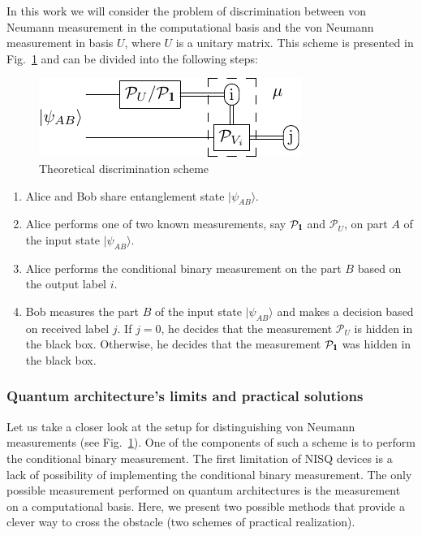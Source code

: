 \documentclass[preprint,12pt, a4paper]{elsarticle}
\newcommand{\ket}[1]{\ensuremath{|#1\rangle}}
\newcommand{\1}{{\rm 1\hspace{-0.9mm}l}}
\newcommand{\Id}{{\rm 1\hspace{-0.9mm}l}}
\newcommand{\PP}{\mathcal{P}}
\begin{document}
In this work we will consider the problem of discrimination between von Neumann measurement in the computational basis  and  the von Neumann measurement in basis $U$, where $U$ is a unitary matrix. 
This scheme is 
presented in Fig.~\ref{fig:theoretical_scheme} and 
can be divided into the following steps:





\begin{figure}[h!]
	\centering
	\includegraphics[scale=1.7]{pics/theoretical_scheme}
	\caption{Theoretical discrimination scheme}
	\label{fig:theoretical_scheme}
\end{figure}


\begin{enumerate}\item Alice and Bob share entanglement state $\ket{\psi_{AB}}$.
	\item Alice performs one of two known measurements,  say $\PP_{\Id}$ and $\PP_{U}$,  on part $A$ of the input 
	state  $\ket{\psi_{AB}}$.
	\item Alice   performs the conditional binary measurement on the part 
	$B$ based on
	the output label $i$. 
	\item  Bob measures the part $B$ of the input state  $\ket{\psi_{AB}}$ and 
	makes a decision based on received label $j$. If $j=0$, he decides that the measurement $\PP_U$ is hidden in the black box. Otherwise, he decides that the measurement $\PP_{\Id}$ was hidden in the black box. 
\end{enumerate}  


\subsubsection{Quantum architecture's limits and practical solutions}



Let us take a closer look at the setup for distinguishing von Neumann 
measurements (see Fig.~\ref{fig:theoretical_scheme}). One of the components of such a 
scheme is to perform the conditional binary measurement. The first limitation of NISQ devices 
is a lack of possibility of implementing the conditional binary measurement. 
The only possible measurement performed on quantum architectures is the measurement 
on a computational basis. 
Here, we present two possible methods that provide a clever way to cross the obstacle (two schemes of practical realization). 
\end{document}

